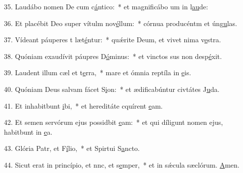35. Laudábo nomen De cum c\uline{á}ntico:~* et magnificábo um in l\uline{au}de:\par 
36. Et placébit Deo super vítulm nov\uline{é}llum:~* córnua producéntm et úng\uline{u}las.\par 
37. Vídeant páuperes t læt\uline{é}ntur:~* quǽrite Deum, et vivet nima v\uline{e}stra.\par 
38. Quóniam exaudívit páupres D\uline{ó}minus:~* et vinctos sus non desp\uline{é}xit.\par 
39. Laudent illum cæl et t\uline{e}rra,~* mare et ómnia reptíla in \uline{e}is.\par 
40. Quóniam Deus salvam fácet S\uline{i}on:~* et ædificabúntur civtátes J\uline{u}da.\par 
41. Et inhabitbunt \uline{i}bi,~* et hereditáte cquírent \uline{e}am.\par 
42. Et semen servórum ejus possidbit \uline{e}am:~* et qui díligunt nomen ejus, habitbunt in \uline{e}a.\par 
43. Glória Patr, et F\uline{í}lio,~* et Spirtui S\uline{a}ncto.\par 
44. Sicut erat in princípio, et nnc, et s\uline{e}mper,~* et in sǽcula sæclórum. \uline{A}men.\par 

